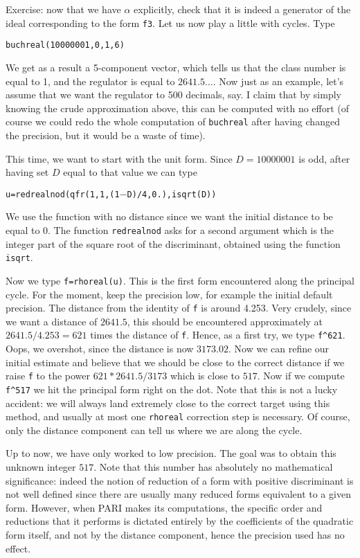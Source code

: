 Exercise: now that we have $\alpha$ explicitly, check that it is indeed a 
generator of the ideal corresponding to the form {\tt f3}.
\medskip
Let us now play a little with cycles. Type

\centerline{\tt buchreal(10000001,0,1,6)}

We get as a result a 5-component vector, which tells us that the class number
is equal to 1, and the regulator is equal to $2641.5\dots$.
Now just as an example, let's assume that we want the regulator to 500
decimals, say. I claim that by simply knowing the crude approximation above,
this can be computed with no effort (of course we could redo the whole 
computation of {\tt buchreal} after having changed the precision, but it
would be a waste of time).

This time, we want to start with the unit form. Since $D=10000001$ is odd,
after having set $D$ equal to that value we can type

\centerline{\tt u=redrealnod(qfr(1,1,(1$-$D)/4,0.),isqrt(D))}

We use the function with no distance since we want the initial distance to be
equal to 0. The function {\tt redrealnod} asks for a second argument which is
the integer part of the square root of the discriminant, obtained using the 
function {\tt isqrt}.

Now we type  {\tt f=rhoreal(u)}. This is the first form encountered along the
principal cycle. For the moment, keep the precision low, for example the
initial default precision. The distance from the identity of {\tt f} is
around 4.253. Very crudely, since we want a distance of $2641.5$, this should
be encountered approximately at $2641.5/4.253=621$ times the distance of 
{\tt f}. Hence, as a first try, we type {\tt f\^{}621}. Oops, we overshot,
since the distance is now $3173.02$. Now we can refine our initial estimate
and believe that we should be close to the correct distance if we raise {\tt f}
to the power $621*2641.5/3173$ which is close to $517$. Now if we compute
{\tt f\^{}517} we hit the principal form right on the dot. Note that this is
not a lucky accident: we will always land extremely close to the correct target
using this method, and usually at most one {\tt rhoreal} correction step is
necessary. Of course, only the distance component can tell us where we are
along the cycle.

Up to now, we have only worked to low precision. The goal was to obtain this
unknown integer $517$. Note that this number has absolutely no mathematical
significance: indeed the notion of reduction of a form with positive 
discriminant is not well defined since there are usually many reduced forms
equivalent to a given form. However, when PARI makes its computations, the
specific order and reductions that it performs is dictated entirely by the
coefficients of the quadratic form itself, and not by the distance component,
hence the precision used has no effect.

